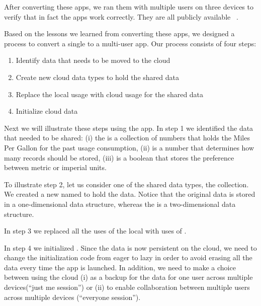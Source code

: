 \documentclass[preprint]{sigplanconf}
\begin{document}
After converting these apps, we ran them with multiple users on three devices to verify that in fact the apps work correctly. They are all publicly available~\cite{MileageTrackerFinal,BusinessManagerFinal,CliffHangersFinal,MyAssignmentsFinal} .

Based on the lessons we learned from converting these \numFormative apps, we designed a process to convert  a single to a multi-user app.  Our process consists of four steps:   
\begin{enumerate}
\item Identify data that needs to be moved to the cloud

\item Create new cloud data types to hold the shared data

\item Replace the local usage with cloud usage for the shared data

\item Initialize cloud data
\end{enumerate}

Next we will illustrate these steps using the \MT app.  In step 1 we identified the data that needed to be shared: 
(i) the  is a collection of numbers that holds the Miles Per Gallon for the past usage consumption, 
(ii)  is a number that determines how many records should be stored, 
(iii)  is a boolean that stores the preference between metric or imperial units.
   
To illustrate step 2, let us consider one of the shared data types, the  collection. 
We created a new  named  to hold the data. Notice that the
original data is stored in a one-dimensional data structure, whereas the  is a two-dimensional data 
structure.

In step 3 we replaced all the uses of the local  with uses of . 

In step 4 we initialized  . 
Since the data is now persistent on the cloud, we need to change the initialization code from 
eager to lazy in order to avoid erasing all the data every time the app is launched.  
In addition, we need to make a choice between using the cloud (i) as a backup for the data for one user across multiple devices(``just me session'') or (ii) to enable collaboration between multiple users across multiple devices (``everyone session'').  
\end{document}
